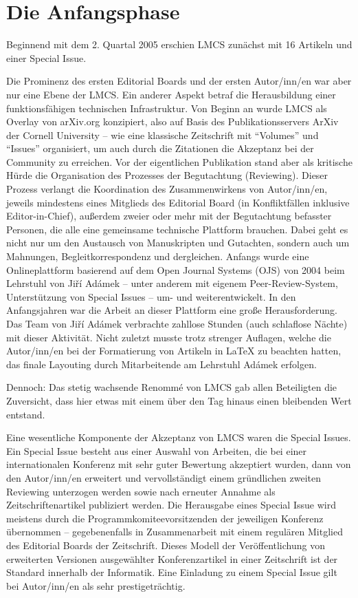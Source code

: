 \documentclass[a4paper,
fontsize=11pt,
oneside,
numbers=noperiodatend,
parskip=half-,
bibliography=totoc,
final
]{scrartcl}
\begin{document}
\hypertarget{die-anfangsphase}{%
\section{Die Anfangsphase}\label{die-anfangsphase}}

Beginnend mit dem 2. Quartal 2005 erschien LMCS zunächst mit 16 Artikeln
und einer Special Issue.

Die Prominenz des ersten Editorial Boards und der ersten Autor/inn/en
war aber nur eine Ebene der LMCS. Ein anderer Aspekt betraf die
Herausbildung einer funktionsfähigen technischen Infrastruktur. Von
Beginn an wurde LMCS als Overlay von arXiv.org konzipiert, also auf
Basis des Publikationsservers ArXiv der Cornell University -- wie eine
klassische Zeitschrift mit \enquote{Volumes} und \enquote{Issues}
organisiert, um auch durch die Zitationen die Akzeptanz bei der
Community zu erreichen. Vor der eigentlichen Publikation stand aber als
kritische Hürde die Organisation des Prozesses der Begutachtung
(Reviewing). Dieser Prozess verlangt die Koordination des
Zusammenwirkens von Autor/inn/en, jeweils mindestens eines Mitglieds des
Editorial Board (in Konfliktfällen inklusive Editor-in-Chief), außerdem
zweier oder mehr mit der Begutachtung befasster Personen, die alle eine
gemeinsame technische Plattform brauchen. Dabei geht es nicht nur um den
Austausch von Manuskripten und Gutachten, sondern auch um Mahnungen,
Begleitkorrespondenz und dergleichen. Anfangs wurde eine Onlineplattform
basierend auf dem Open Journal Systems (OJS) von 2004 beim Lehrstuhl von
Jiří Adámek -- unter anderem mit eigenem Peer-Review-System,
Unterstützung von Special Issues -- um- und weiterentwickelt. In den
Anfangsjahren war die Arbeit an dieser Plattform eine große
Herausforderung. Das Team von Jiří Adámek verbrachte zahllose Stunden
(auch schlaflose Nächte) mit dieser Aktivität. Nicht zuletzt musste
trotz strenger Auflagen, welche die Autor/inn/en bei der Formatierung
von Artikeln in LaTeX zu beachten hatten, das finale Layouting durch
Mitarbeitende am Lehrstuhl Adámek erfolgen.

Dennoch: Das stetig wachsende Renommé von LMCS gab allen Beteiligten die
Zuversicht, dass hier etwas mit einem über den Tag hinaus einen
bleibenden Wert entstand.

Eine wesentliche Komponente der Akzeptanz von LMCS waren die Special
Issues. Ein Special Issue besteht aus einer Auswahl von Arbeiten, die
bei einer internationalen Konferenz mit sehr guter Bewertung akzeptiert
wurden, dann von den Autor/inn/en erweitert und vervollständigt einem
gründlichen zweiten Reviewing unterzogen werden sowie nach erneuter
Annahme als Zeitschriftenartikel publiziert werden. Die Herausgabe eines
Special Issue wird meistens durch die Programmkomiteevorsitzenden der
jeweiligen Konferenz übernommen -- gegebenenfalls in Zusammenarbeit mit
einem regulären Mitglied des Editorial Boards der Zeitschrift. Dieses
Modell der Veröffentlichung von erweiterten Versionen ausgewählter
Konferenzartikel in einer Zeitschrift ist der Standard innerhalb der
Informatik. Eine Einladung zu einem Special Issue gilt bei Autor/inn/en
als sehr prestigeträchtig.
\end{document}
